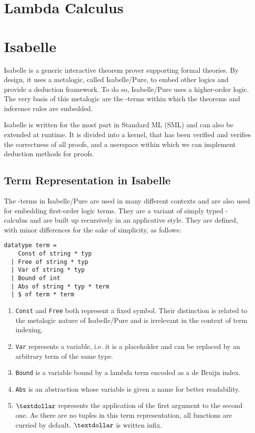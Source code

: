 \section{Lambda Calculus}

\section{Isabelle}
Isabelle is a generic interactive theorem prover supporting formal theories. By design, it uses a metalogic, called Isabelle/Pure, to embed other logics and provide a deduction framework. To do so, Isabelle/Pure uses a higher-order logic. The very basis of this metalogic are the \lam -terms within which the theorems and inference rules are embedded.

Isabelle is written for the most part in Standard ML (SML) and can also be extended at runtime. It is divided into a kernel, that has been verified and verifies the correctness of all proofs, and a userspace within which we can implement deduction methods for proofs.

\subsection{Term Representation in Isabelle}
The \lam -terms in Isabelle/Pure are used in many different contexts and are also used for embedding first-order logic terms. They are a variant of simply typed \lam -calculus and are built up recursively in an applicative style. They are defined, with minor differences for the sake of simplicity, as follows:
\begin{lstlisting}
datatype term =
    Const of string * typ
  | Free of string * typ
  | Var of string * typ
  | Bound of int
  | Abs of string * typ * term
  | $ of term * term
\end{lstlisting} %
\begin{enumerate}
  \item \verb!Const! and \verb!Free! both represent a fixed symbol. Their distinction is related to the metalogic nature of Isabelle/Pure and is irrelevant in the context of term indexing.
  \item \verb!Var! represents a variable, i.e. it is a placeholder and can be replaced by an arbitrary term of the same type.
  \item \verb!Bound! is a variable bound by a lambda term encoded as a de Bruijn index.
  \item \verb!Abs! is an abstraction whose variable is given a name for better readability.
  \item $\textdollar$ represents the application of the first argument to the second one. As there are no tuples in this term representation, all functions are curried by default. $\textdollar$ is written infix.
\end{enumerate}

